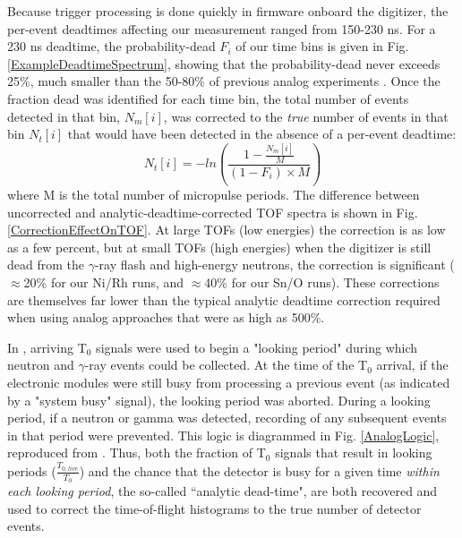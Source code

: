 Because trigger processing is done quickly in
firmware onboard the digitizer, the per-event deadtimes affecting our
measurement ranged from 150-230 ns. For a 230 ns deadtime, the probability-dead
$F_{i}$ of our time bins is given in Fig.
\ref{ExampleDeadtimeSpectrum}, showing that the probability-dead never exceeds
25\%, much smaller than the 50-80\% of previous analog experiments \cite{Finlay1993,
Abfalterer2001}.
Once the fraction dead was identified for each time bin, the total number of
events detected in that bin, $N_{m}[i]$, was corrected to the \textit{true}
number of events in that bin $N_{t}[i]$ that would have been detected in the
absence of a
per-event deadtime:
\begin{equation}
    N_{t}[i] = -ln\left(\frac{1-\frac{N_m[i]}{M}}{(1-F_{i})\times M}\right)
\end{equation}
where M is the total number of micropulse periods. The difference between
uncorrected and analytic-deadtime-corrected TOF spectra is shown in Fig.
\ref{CorrectionEffectOnTOF}. At large TOFs (low energies) the correction is as low as a
few percent, but at small TOFs (high energies) when the digitizer is still dead
from the $\gamma$-ray flash and high-energy neutrons, the correction is significant
($\approx$20\% for our Ni/Rh runs, and $\approx$40\% for our Sn/O runs). These 
corrections are themselves far lower than the typical
analytic deadtime correction required when using analog approaches \cite{Finlay1993,
Abfalterer2001} that were as high as 500\%.%

 In \cite{Finlay1993, Abfalterer2001},
arriving T$_{0}$ signals were used to begin a "looking period" during which neutron and $\gamma$-ray
events could be collected. At the time of the T$_{0}$ arrival, if the electronic modules
were still busy from processing a previous event (as indicated by a "system busy" signal),
the looking period was aborted. During a looking period, if a neutron or gamma
was detected, recording of any subsequent events in that period were prevented.
This logic is diagrammed in Fig. \ref{AnalogLogic}, reproduced from
\cite{Abfalterer2001}. Thus, both the fraction of T$_{0}$ signals that result in looking
periods ($\frac{T_{0,live}}{T_{0}}$) and the chance that the detector is busy
for a given time \textit{within each looking period}, the so-called ``analytic
dead-time", are both recovered and used to correct the time-of-flight histograms
to the true number of detector events.

